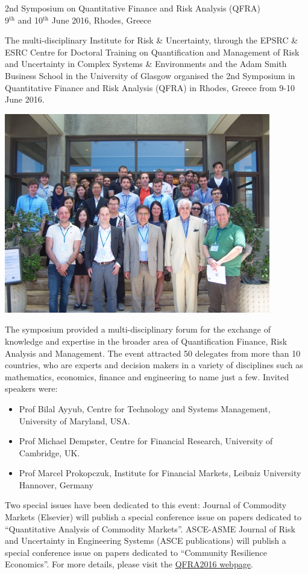\documentclass[11pt]{article}%
\begin{document}
\cleardoublepage

\thispagestyle{Training}
\begin{minipage}{1.\textwidth}
\vspace{20pt}
{\LARGE {2nd Symposium on Quantitative Finance and Risk Analysis (QFRA)}}\\
{\large 9$^{\text{th}}$ and 10$^{\text{th}}$ June 2016, Rhodes, Greece}
\begin{multicols}{2}
The multi-disciplinary Institute for Risk \& Uncertainty, through the EPSRC \& ESRC Centre for Doctoral Training on Quantification and Management of Risk and Uncertainty in Complex Systems & Environments and the Adam Smith Business School in the University of Glasgow organised the 2nd Symposium in Quantitative Finance and Risk Analysis (QFRA) in Rhodes, Greece from 9-10 June 2016.

\includegraphics[width=1\linewidth]{training/PictureSS1.png}

The symposium provided a multi-disciplinary forum for the exchange of knowledge and expertise in the broader area of Quantification Finance, Risk Analysis and Management. The event attracted 50 delegates from more than 10 countries, who are experts and decision makers in a variety of disciplines such as mathematics, economics, finance and engineering to name just a few. Invited speakers were:
\begin{itemize}
    \item Prof Bilal Ayyub, Centre for Technology and Systems Management, University of Maryland, USA. 
    \item Prof Michael Dempster, Centre for Financial Research, University of Cambridge, UK.
    \item Prof Marcel Prokopczuk, Institute for Financial Markets, Leibniz University Hannover, Germany
\end{itemize}
Two special issues have been dedicated to this event:
Journal of Commodity Markets (Elsevier) will publish a special conference issue on papers dedicated to ``Quantitative Analysis of Commodity Markets''. 
ASCE-ASME Journal of Risk and Uncertainty in Engineering Systems (ASCE publications) will publish a special conference issue on papers dedicated to “Community Resilience Economics”. 
For more details, please visit the \href{https://www.liverpool.ac.uk/qfra/}{QFRA2016 webpage}.


\end{multicols}
\end{minipage}
\end{document}
